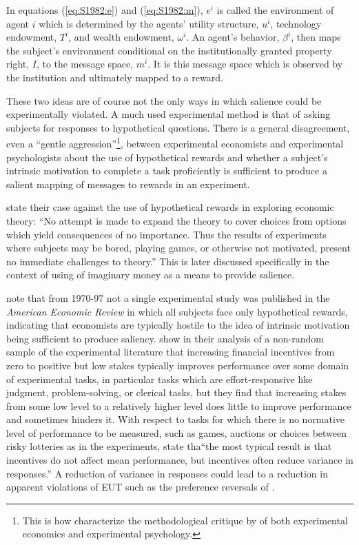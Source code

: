 \documentclass[../main.tex]{subfiles}
\begin{document}
In equations (\ref{eq:S1982:e}) and (\ref{eq:S1982:m}), $e^i$ is called the environment of agent $i$ which is determined by the agents' utility structure, $u^i$, technology endowment, $T^i$, and wealth endowment, $\omega^i$.
An agent's behavior, $\beta^i$, then maps the subject's environment conditional on the institutionally granted property right, $I$, to the message space, $m^i$.
It is this message space which is observed by the institution and ultimately mapped to a reward.

These two ideas are of course not the only ways in which salience could be experimentally violated.
A much used experimental method is that of asking subjects for responses to hypothetical questions.
There is a general disagreement, even a \enquote{gentle aggression}\footnote{This is how \textcite{Hertwig2001} characterize the methodological critique by \textcite{Smith1982} of both experimental economics and experimental psychology.}, between experimental economists and experimental psychologists about the use of hypothetical rewards and whether a subject's intrinsic motivation to complete a task proficiently is sufficient to produce a salient mapping of messages to  rewards in an experiment.

\textcite[624]{Grether1979} state their case against the use of hypothetical rewards in exploring economic theory:
\enquote{No attempt is made to expand the theory to cover choices from options which yield consequences of no importance.\textelp{} Thus the results of experiments where subjects may be bored, playing games, or otherwise not motivated, present no immediate challenges to theory.} 
This is later discussed specifically in the context of using of imaginary money as a means to provide salience.

\textcite[31]{Camerer1999} note that from 1970-97 not a single experimental study was published in the \textit{American Economic Review} in which all subjects face only hypothetical rewards, indicating that economists are typically hostile to the idea of intrinsic motivation being sufficient to produce saliency.
\textcite{Camerer1999} show in their analysis of a non-random sample of the experimental literature that increasing financial incentives from zero to positive but low stakes typically improves performance over some domain of experimental tasks, in particular tasks which are effort-responsive like judgment, problem-solving, or clerical tasks, but they find that increasing stakes from some low level to a relatively higher level does little to improve performance and sometimes hinders it.
With respect to tasks for which there is no normative level of performance to be measured, such as games, auctions or choices between risky lotteries as in the \textcite{Grether1979} experiments, \textcite[34]{Camerer1999} state tha\enquote{the most typical result is that incentives do not affect mean performance, but incentives often reduce variance in responses.}
A reduction of variance in responses could lead to a reduction in apparent violations of EUT such as the preference reversals of \textcite{Grether1979}.
\end{document}
